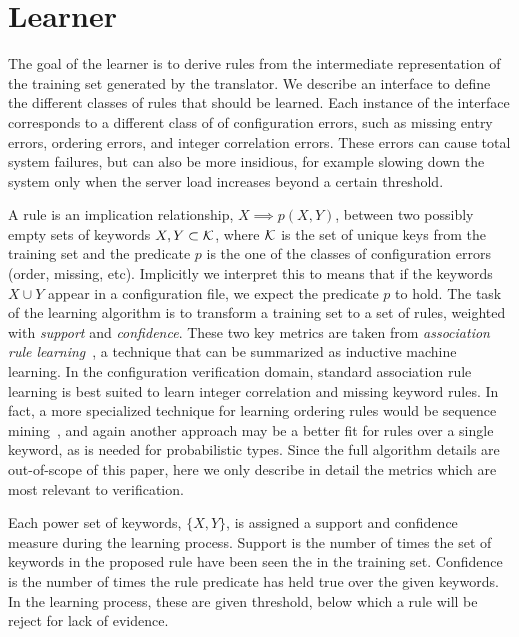 \section{Learner}
\label{sec-learn}

The goal of the learner is to derive rules from the intermediate representation of the training set generated by the translator.
We describe an interface to define the different classes of rules that should be learned.
Each instance of the interface corresponds to a different class of of configuration errors, such as missing entry errors, ordering errors, and integer correlation errors. 
These errors can cause total system failures, but can also be more insidious, for example slowing down the system only when the server load increases beyond a certain threshold.

A rule is an implication relationship, $X \implies p(X,Y)$, between two possibly empty sets of keywords $X,Y \subset \mathcal{K}$, where $\mathcal{K}$ is the set of unique keys from the training set and the predicate $p$ is the one of the classes of configuration errors (order, missing, etc).
Implicitly we interpret this to means that if the keywords $X\cup Y$ appear in a configuration file, we expect the predicate $p$ to hold.
The task of the learning algorithm is to transform a training set to a set of rules, weighted with \textit{support} and \textit{confidence}.
These two key metrics are taken from \textit{association rule learning}~\cite{agrawal1993mining}, a technique that can be summarized as inductive machine learning.
In the configuration verification domain, standard association rule learning is best suited to learn integer correlation and missing keyword rules.
In fact, a more specialized technique for learning ordering rules would be sequence mining~\cite{}, and again another approach may be a better fit for rules over a single keyword, as is needed for probabilistic types.
Since the full algorithm details are out-of-scope of this paper, here we only describe in detail the metrics which are most relevant to verification.

Each power set of keywords, $\{X,Y\}$, is assigned a support and confidence measure during the learning process.
Support is the number of times the set of keywords in the proposed rule have been seen the in the training set.
Confidence is the number of times the rule predicate has held true over the given keywords.
In the learning process, these are given threshold, below which a rule will be reject for lack of evidence.

